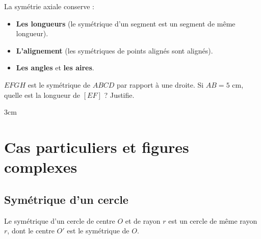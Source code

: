 \documentclass[a4paper]{book}
\begin{document}
    \begin{propriete}
        La symétrie axiale conserve :
        \begin{itemize}
            \item \textbf{Les longueurs} (le symétrique d'un segment est un segment de même longueur).
            \item \textbf{L'alignement} (les symétriques de points alignés sont alignés).
            \item \textbf{Les angles} et \textbf{les aires}.
        \end{itemize}
    \end{propriete}
    
    
    \begin{methode}
        $EFGH$ est le symétrique de $ABCD$ par rapport à une droite. Si $AB = 5$ cm, quelle est la longueur de $[EF]$ ? Justifie.
        \begin{ZoneReponse}{3cm}
        \end{ZoneReponse}
    \end{methode}
    
    
\section{Cas particuliers et figures complexes}
    
    \subsection{Symétrique d'un cercle}
    \begin{propriete}
        Le symétrique d'un cercle de centre $O$ et de rayon $r$ est un cercle de même rayon $r$, dont le centre $O'$ est le symétrique de $O$.
    \end{propriete}
    
    \begin{center}
    \end{center}
    
\end{document}
